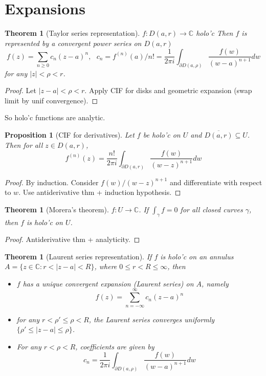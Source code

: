 \documentclass{article}
\theoremstyle{definition}
\theoremstyle{remark}
\theoremstyle{plain}
\newtheorem{thm}[defn]{Theorem}
\newtheorem{prop}[defn]{Proposition}
\newcommand{\CC}{\mathbb{C}}
\begin{document}
\section{Expansions}
\begin{thm}[Taylor series representation]
    $f:D(a,r)\to\CC$ holo'c Then $f$ is represented by a convergent power series on $D(a,r)$
    \[f(z)=\sum_{n\ge 0}c_n(z-a)^n,\text{ }c_n=f^{(n)}(a)/n!=\dfrac{1}{2\pi i}\int_{\partial D(a,\rho)}\dfrac{f(w)}{(w-a)^{n+1}}dw\]
    for any $|z|<\rho<r$.
\end{thm}
\begin{proof}
    Let $|z-a|<\rho<r$. Apply CIF for disks and geometric expansion (swap limit by unif convergence).
\end{proof}
So holo'c functions are analytic.
\begin{prop}[CIF for derivatives] Let $f$ be holo'c on $U$ and $\overline{D(a,r)}\subseteq U$. Then for all $z\in D(a,r)$,
\[f^{(n)}(z)=\dfrac{n!}{2\pi i}\int_{\partial D(a,r)}\dfrac{f(w)}{(w-z)^{n+1}}dw\]
\end{prop}
\begin{proof}
    By induction. Consider $f(w)/(w-z)^{n+1}$ and differentiate with respect to $w$. Use antiderivative thm + induction hypothesis.
\end{proof}
\begin{thm}[Morera's theorem]
$f:U\to\CC$.
    If $\int_\gamma f=0$ for all closed curves $\gamma$, then $f$ is holo'c on $U$.
\end{thm}
\begin{proof}
    Antiderivative thm + analyticity.
\end{proof}
\begin{thm}[Laurent series representation]
    If $f$ is holo'c on an annulus $A=\{z\in\CC:r<|z-a|<R\}$, where $0\le r<R\le \infty$, then
    \begin{itemize}
        \item $f$ has a unique convergent expansion (Laurent series) on $A$, namely
        \[f(z)=\sum_{n=-\infty}^\infty c_n(z-a)^n\]
        \item for any $r<\rho'\le \rho<R$, the Laurent series converges uniformly $\{\rho'\le|z-a|\le \rho\}$.
        \item For  any $r<\rho<R$, coefficients are given by \[c_n=\dfrac{1}{2\pi i}\int_{\partial D(a,\rho)}\dfrac{f(w)}{(w-a)^{n+1}}dw\]
    \end{itemize}
\end{thm}
\end{document}
